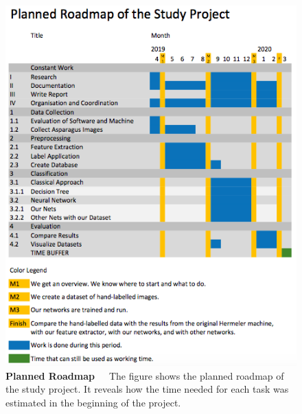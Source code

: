 \begin{figure}[h]
	\centering
	\includegraphics[scale=0.7]{Figures/chapter02/roadmap_planned.png}
	\decoRule
	\caption[Planned Roadmap]{\textbf{Planned Roadmap}~~~The figure shows the planned roadmap of the study project. It reveals how the time needed for each task was estimated in the beginning of the project.}
	\label{fig:RoadmapPlanned}
\end{figure}

